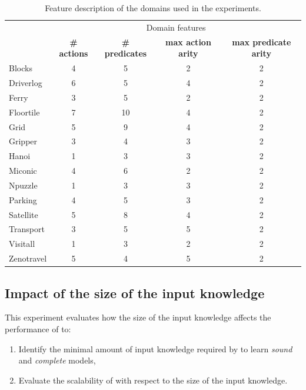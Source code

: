 \begin{table}[hbt!]
		\begin{center}
			\begin{tabular}{l|c|c|c|c|}	
				& \multicolumn{4}{c|}{Domain features}\\ \cline{2-5}
				 & {\bf \# actions} & {\bf \# predicates} & {\bf max action arity} & {\bf max predicate arity}  \\
				\hline
				Blocks & 4 & 5 & 2 & 2  \\
				Driverlog & 6 & 5 & 4 & 2  \\
				Ferry & 3 & 5 & 2 & 2  \\
				Floortile & 7 & 10 & 4 & 2  \\
				Grid & 5 & 9 & 4 & 2  \\
				Gripper & 3 & 4 & 3 & 2  \\
				Hanoi & 1 & 3 & 3 & 2  \\
				Miconic & 4 & 6 & 2 & 2  \\
				Npuzzle & 1 & 3 & 3 & 2  \\
				Parking & 4 & 5 & 3 & 2  \\
				Satellite & 5 & 8 & 4 & 2  \\
				Transport & 3 & 5 & 5 & 2  \\
				Visitall & 1 & 3 & 2 & 2  \\
				Zenotravel & 5 & 4 & 5 & 2
			\end{tabular}
		\end{center}
	\caption{\small Feature description of the domains used in the experiments.}
	\label{tab:domain_features}	
\end{table}

\subsection{Impact of the size of the input knowledge}
This experiment evaluates how the size of the input knowledge affects the performance of \FAMA to:
\begin{enumerate}
	\item Identify the minimal amount of input knowledge required by \FAMA to learn {\em sound} and {\em complete} models,
	\item Evaluate the scalability of \FAMA with respect to the size of the input knowledge. %
\end{enumerate} 

